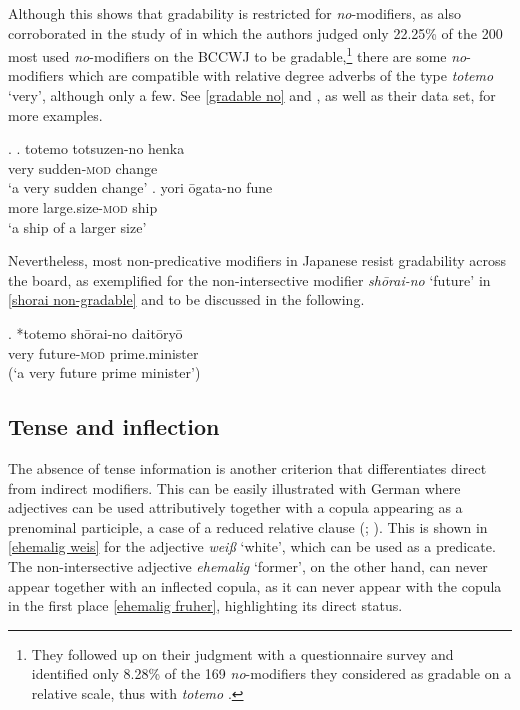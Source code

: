 Although this shows that gradability is restricted for \textit{no}-modifiers, as also corroborated in the study of \citet{oshima:2019:gradability} in which the authors judged only 22.25\% of the 200 most used \textit{no}-modifiers on the BCCWJ to be gradable,\footnote{They followed up on their judgment with a questionnaire survey and identified only 8.28\% of the 169 \textit{no}-modifiers they considered as gradable on a relative scale, thus with \textit{totemo} \citep[29]{oshima:2019:gradability}.} there are some \textit{no}-modifiers which are compatible with relative degree adverbs of the type \textit{totemo} `very’, although only a few. See \ref{gradable no} and \citet{oshima:2019:gradability}, as well as their data set, for more examples.

\ex. \label{gradable no} \ag. totemo totsuzen-no henka\\
very sudden-\textsc{mod} change\\
`a very sudden change’
\bg. yori ōgata-no fune\\
more large.size-\textsc{mod} ship\\
`a ship of a larger size’ \null \hfill \citep[16]{oshima:2019:gradability}

\newpage
Nevertheless, most non-predicative modifiers in Japanese resist gradability across the board, as exemplified for the non-intersective modifier \textit{shōrai-no} `future’ in \ref{shorai non-gradable} and to be discussed in the following.

\exg. *totemo shōrai-no daitōryō\\
very future-\textsc{mod} prime.minister\\
(`a very future prime minister’) \label{shorai non-gradable}

\subsection{Tense and inflection} \label{test tense}

The absence of tense information is another criterion that differentiates direct from indirect modifiers. This can be easily illustrated with  German where adjectives can be used attributively together with a copula appearing as a prenominal participle, a case of a reduced relative clause (\citealt[203]{cinque:2020:relcl}; \citealt{krause:2001:rrc, douglas:2016:syntactic, harwood:2018:rrc}). This is shown in \ref{ehemalig weis} for the adjective \textit{weiß} `white’, which can be used as a predicate. The non-intersective adjective \textit{ehemalig} `former’, on the other hand, can never appear together with an inflected copula, as it can never appear with the copula in the first place \ref{ehemalig fruher}, highlighting its direct status.

